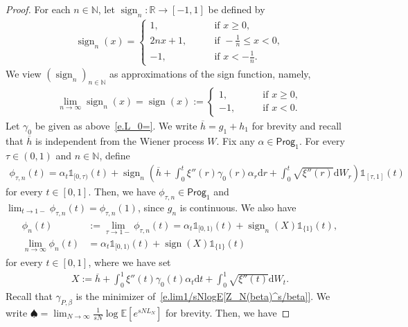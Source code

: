 \documentclass[10pt,a4paper]{amsart}
\newcommand{\E}{\mathbb{E}}
\newcommand{\Ll}{\left}
\newcommand{\N}{\mathbb{N}}
\newcommand{\R}{\mathbb{R}}
\newcommand{\Rr}{\right}
\renewcommand{\bar}{\overline}
\renewcommand{\d}{\mathrm{d}}
\renewcommand{\geq}{\geqslant}
\renewcommand{\leq}{\leqslant}
\newcommand{\prog}{\mathsf{Prog}}
\DeclareMathOperator{\sign}{sign}
\begin{document}
\begin{proof}
For each $n\in \N$, let $\sign_n:\R\to[-1,1]$ be defined by
\begin{align*}
    \sign_n(x) = 
    \begin{cases}
        1, \qquad &\text{if }x\geq 0,
        \\
        2nx + 1, \qquad &\text{if } -\frac{1}{n}\leq x<0,
        \\
        -1, \qquad &\text{if } x<-\frac{1}{n}.
    \end{cases}
\end{align*}
We view $(\sign_n)_{n\in\N}$ as approximations of the sign function, namely,
\begin{align*}
    \lim_{n\to\infty} \sign_n(x) = \sign(x):=
    \begin{cases}
        1  , \qquad &\text{if }x\geq 0,
        \\
        -1 , \qquad &\text{if }x< 0.
    \end{cases}
\end{align*}
Let $\gamma_0$ be given as above~\eqref{e.L_0=}. We write $\bar h= g_1+h_1$ for brevity and recall that $\bar h$ is independent from the Wiener process $W$.
Fix any $\alpha\in\prog_1$. For every $\tau\in(0,1)$ and $n\in\N$, define
\begin{align*}
    \phi_{\tau,n}(t) = \alpha_t\mathds{1}_{[0,\tau)}(t) + \sign_n\Ll(\bar h+\int_0^t\xi''(r)\gamma_0(r)\alpha_r\d r + \int_0^t\sqrt{\xi''(r)}\d W_r\Rr)\mathds{1}_{[\tau,1]}(t)
\end{align*}
for every $t\in[0,1]$. Then, we have $\phi_{\tau,n}\in\prog_1$ and $\lim_{t\to1-}\phi_{\tau,n}(t) = \phi_{\tau,n}(1)$, since $g_n$ is continuous. We also have
\begin{align}\label{e.phi_n...}
\begin{split}
    \phi_n(t) &:=\lim_{\tau\to1-}\phi_{\tau,n}(t)=\alpha_t\mathds{1}_{[0,1)}(t)+\sign_n(X)\mathds{1}_{\{1\}}(t),
    \\
    \lim_{n\to\infty}\phi_n(t) &= \alpha_t\mathds{1}_{[0,1)}(t)+\sign(X)\mathds{1}_{\{1\}}(t)
\end{split}
\end{align}
for every $t\in[0,1]$, where we have set
\begin{align}\label{e.X=}
    X:=\bar h +\int_0^1\xi''(t)\gamma_0(t)\alpha_t\d t+ \int_0^1\sqrt{\xi''(t)}\d W_t.
\end{align}
Recall that $\gamma_{P,\beta}$ is the minimizer of~\eqref{e.lim1/sNlogE[Z_N(beta)^s/beta]}. We write $\spadesuit= \lim_{N\to \infty} \frac{1}{sN} \log \E \Ll[ e^{sN L_N} \Rr] $ for brevity. Then, we have

\end{proof}
\end{document}
